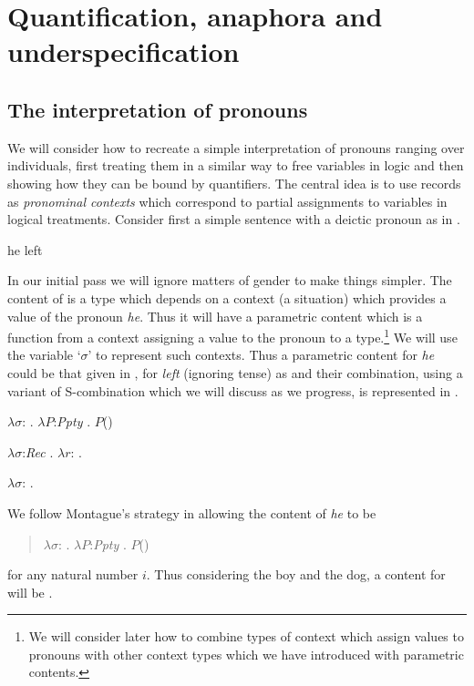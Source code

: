 \chapter{Quantification, anaphora and underspecification}
\label{ch:quant}
\setcounter{examplectr}{0}

\section{The interpretation of pronouns}
We will consider how to recreate a simple interpretation of pronouns
ranging over individuals, first treating them in a similar way to free
variables in logic and then showing how they can be bound by
quantifiers.  The central idea is to use records as \textit{pronominal
  contexts} which correspond to partial assignments to variables in
logical treatments.  Consider first a simple sentence with a deictic
pronoun as in \nexteg{}.
\begin{ex} 
he left 
\end{ex} 
In our initial pass we will ignore matters
of gender to make things simpler.  The content of \preveg{} is a type
which depends on a context (a situation) which provides a value of the
pronoun \textit{he}. Thus it will have a parametric content which is a
function from a context assigning a value to the pronoun to a
type.\footnote{We will consider later how to combine types of context
  which assign values to pronouns with other context types which we
  have introduced with parametric contents.}  We will use the variable
`$\sigma$' to represent such contexts.  Thus a parametric content for
\textit{he} could be that given in , for \textit{left}
(ignoring tense) as  and their combination, using a variant
of S-combination which we will discuss as we progress, is represented
in .
\begin{ex} 
\begin{subex} 
 
\item $\lambda\sigma$: . 
        $\lambda P$:\textit{Ppty} . $P$()
 
\item $\lambda\sigma$:\textit{Rec} . 
        $\lambda r$: . 

\item $\lambda\sigma$:
  . 
 
\end{subex} 
   
\end{ex}
We follow Montague's strategy in allowing the content of \textit{he}
to be 
\begin{quote}
$\lambda\sigma$: . 
        $\lambda P$:\textit{Ppty}
        . $P$()
\end{quote} 
for any natural number $i$.  Thus considering the boy and the dog, a
content for  will be .
  


